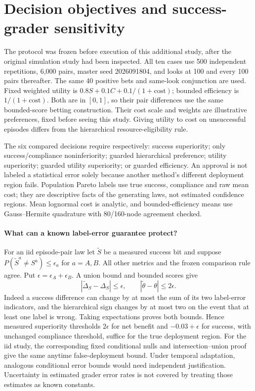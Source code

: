 \section{Decision objectives and success-grader sensitivity}
\label{app:ablations}
The protocol was frozen before execution of this additional study, after
the original simulation study had been inspected. All ten cases use 500
independent repetitions, 6,000 pairs, master seed 2026091804, and looks
at 100 and every 100 pairs thereafter. The same 40 positive bets and
same-look conjunction are used. Fixed weighted utility is
$0.8S+0.1C+0.1/(1+\mathrm{cost})$; bounded efficiency is
$1/(1+\mathrm{cost})$. Both are in $[0,1]$, so their pair differences
use the same bounded-score betting construction. Their cost scale and
weights are illustrative preferences, fixed before seeing this study.
Giving utility to cost on unsuccessful episodes differs from the
hierarchical resource-eligibility rule.

The six compared decisions require respectively: success superiority;
only success/compliance noninferiority; guarded hierarchical preference;
utility superiority; guarded utility superiority; or guarded efficiency.
An approval is not labeled a statistical error solely because another
method's different deployment region fails. Population Pareto labels use
true success, compliance and raw mean cost; they are descriptive facts of
the generating laws, not estimated confidence regions. Mean lognormal
cost is analytic, and bounded-efficiency means use Gauss--Hermite
quadrature with 80/160-node agreement checked.

\paragraph{What can a known label-error guarantee protect?}
For an iid episode-pair law let $\widetilde S$ be a measured success bit
and suppose $P(\widetilde S^a\ne S^a)\leq\epsilon_a$ for $a=A,B$.
All other metrics and the frozen comparison rule agree. Put
$\epsilon=\epsilon_A+\epsilon_B$. A union bound and bounded scores give
\[
 |\widetilde\Delta_S-\Delta_S|\leq\epsilon,\qquad
 |\widetilde\theta-\theta|\leq2\epsilon.
\]
Indeed a success difference can change by at most the sum of its two
label-error indicators, and the hierarchical sign changes by at most
two on the event that at least one label is wrong. Taking expectations
proves both bounds. Hence measured superiority thresholds
$2\epsilon$ for net benefit and $-0.03+\epsilon$ for success,
with unchanged compliance threshold, suffice for the true deployment
region. For the iid study, the corresponding fixed conditional nulls
and intersection--union proof give the same anytime false-deployment
bound. Under temporal adaptation, analogous conditional error bounds
would need independent justification. Uncertainty in estimated grader
error rates is not covered by treating those estimates as known constants.

